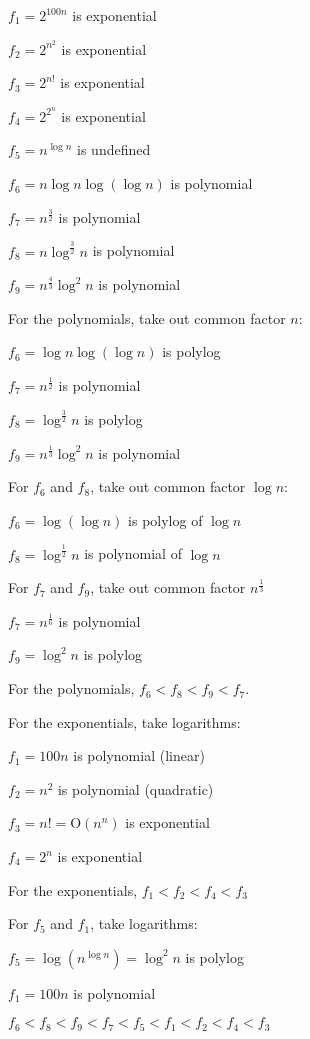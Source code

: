 \begin{ex}
$f_1 = 2^{100n}$ is exponential

$f_2 = 2^{n^2}$ is exponential

$f_3 = 2^{n!}$ is exponential

$f_4 = 2^{2^n}$ is exponential

$f_5 = n^{\log n}$ is undefined

$f_6 = n \log n \log(\log n)$ is polynomial

$f_7 = n^{\tfrac{3}{2}}$ is polynomial

$f_8 = n \log^{\tfrac{3}{2}} n$ is polynomial

$f_9 = n^{\tfrac{4}{3}} \log^2 n$ is polynomial

For the polynomials, take out common factor $n$:

$f_6 = \log n \log(\log n)$ is polylog

$f_7 = n^{\tfrac{1}{2}}$ is polynomial

$f_8 = \log^{\tfrac{3}{2}} n$ is polylog

$f_9 = n^{\tfrac{1}{3}} \log^2 n$ is polynomial

For $f_6$ and $f_8$, take out common factor $\log n$:

$f_6 = \log(\log n)$ is polylog of $\log n$

$f_8 = \log^{\tfrac{1}{2}} n$ is polynomial of $\log n$

For $f_7$ and $f_9$, take out common factor $n^{\tfrac{1}{3}}$

$f_7 = n^{\tfrac{1}{6}}$ is polynomial

$f_9 = \log^2 n$ is polylog

For the polynomials, $f_6 < f_8 < f_9 < f_7$.

For the exponentials, take logarithms:

$f_1 = 100n$ is polynomial (linear)

$f_2 = n^2$ is polynomial (quadratic)

$f_3 = n! = \mathrm{O}(n^n)$ is exponential

$f_4 = 2^n$ is exponential

For the exponentials, $f_1 < f_2 < f_4 < f_3$

For $f_5$ and $f_1$, take logarithms:

$f_5 = \log(n^{\log n}) = \log^2 n$ is polylog

$f_1 = 100n$ is polynomial

$f_6 < f_8 < f_9 < f_7 < f_5 < f_1 < f_2 < f_4 < f_3$
\end{ex}


